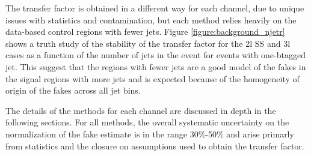 The transfer factor is obtained in a different way for each channel, due to unique issues with statistics and contamination, but each method relies heavily on the data-based control regions with fewer jets. Figure \ref{figure:background_njetr} shows a truth study of the stability of the transfer factor for the 2l SS and 3l cases as a function of the number of jets in the event for events with one-btagged jet. This suggest that the regions with fewer jets are a good model of the fakes in the signal regions with more jets and is expected because of the homogeneity of origin of the fakes across all jet bins.  

The details of the methods for each channel are discussed in depth in the following sections. For all methods, the overall systematic uncertainty on the normalization of the fake estimate is in the range 30\%-50\% and arise primarly from statistics and the closure on assumptions used to obtain the transfer factor.

